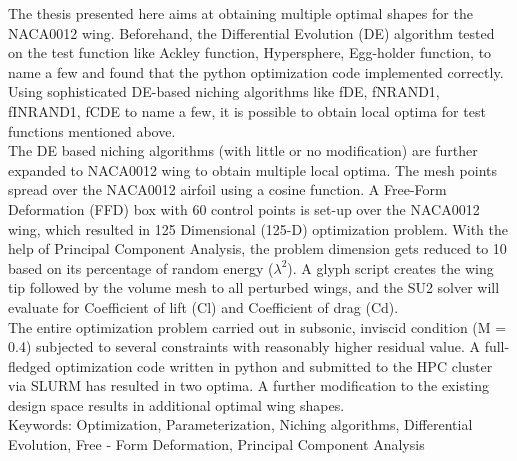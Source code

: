 The thesis presented here aims at obtaining multiple optimal shapes for the NACA0012 wing. Beforehand, the Differential Evolution (DE) algorithm tested on the test function like Ackley function, Hypersphere, Egg-holder function, to name a few and found that the python optimization code implemented correctly. Using sophisticated DE-based niching algorithms like fDE, fNRAND1, fINRAND1, fCDE to name a few, it is possible to obtain local optima for test functions mentioned above.\\[2mm]

The DE based niching algorithms (with little or no modification) are further expanded to NACA0012 wing to obtain multiple local optima. The mesh points spread over the NACA0012 airfoil using a cosine function. A Free-Form Deformation (FFD) box with 60 control points is set-up over the NACA0012 wing, which resulted in 125 Dimensional (125-D) optimization problem. With the help of Principal Component Analysis, the problem dimension gets reduced to 10 based on its percentage of random energy ($\lambda^2$). A glyph script creates the wing tip followed by the volume mesh to all perturbed wings, and the SU2 solver will evaluate for Coefficient of lift (Cl) and Coefficient of drag (Cd).\\[2mm]

The entire optimization problem carried out in subsonic, inviscid condition (M = 0.4) subjected to several constraints with reasonably higher residual value. A full-fledged optimization code written in python and submitted to the HPC cluster via SLURM has resulted in two optima. A further modification to the existing design space results in additional optimal wing shapes.\\[4mm]

Keywords: Optimization, Parameterization, Niching algorithms, Differential Evolution, Free - Form Deformation, Principal Component Analysis